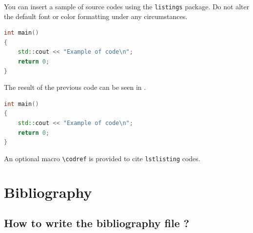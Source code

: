 \documentclass{jmoarticle}
\begin{document}
You can insert a sample of source codes using the \lstinline{listings} package.
Do not alter the default font or color formatting under any circumstances.
%
\begin{lstlistingtex}[caption={Example of source code},style=latex]
\begin{lstlisting}[label=codeexample,
                   caption=C++ source code,
                   language=C++]
int main()
{
    std::cout << "Example of code\n";
    return 0;
}
\end{lstlisting}
\end{lstlistingtex}
%
The result of the previous code can be seen in .
%
\begin{lstlisting}[label=codeexample,
                   caption=C++ source code,
                   language=C++]
int main()
{
    std::cout << "Example of code\n";
    return 0;
}
\end{lstlisting}

\noindent An optional macro \lstinline{\codref} is provided to cite \lstinline{lstlisting} codes.

\section{Bibliography}

\subsection{How to write the bibliography file ?}
\end{document}
